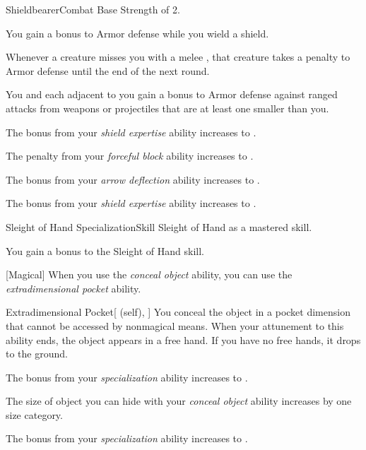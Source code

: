     \begin{feat}{Shieldbearer}{Combat}
        \featpre Base Strength of 2.

         You gain a  bonus to Armor defense while you wield a shield.

         Whenever a creature misses you with a melee , that creature takes a  penalty to Armor defense until the end of the next round.

         You and each  adjacent to you gain a  bonus to Armor defense against  ranged attacks from weapons or projectiles that are at least one  smaller than you.

         The bonus from your \textit{shield expertise} ability increases to .

         The penalty from your \textit{forceful block} ability increases to .

         The bonus from your \textit{arrow deflection} ability increases to .

         The bonus from your \textit{shield expertise} ability increases to .
    \end{feat}

    \begin{feat}{Sleight of Hand Specialization}{Skill}
        \featpre Sleight of Hand as a mastered skill.

         You gain a  bonus to the Sleight of Hand skill.


        [Magical] When you use the \textit{conceal object} ability, you can use the \textit{extradimensional pocket} ability.
        \begin{attuneability}{Extradimensional Pocket}[ (self), ]
            You conceal the object in a pocket dimension that cannot be accessed by nonmagical means.
            When your attunement to this ability ends, the object appears in a free hand.
            If you have no free hands, it drops to the ground.
        \end{attuneability}

         The bonus from your \textit{specialization} ability increases to .

         The size of object you can hide with your \textit{conceal object} ability increases by one size category.

         The bonus from your \textit{specialization} ability increases to .

    \end{feat}

